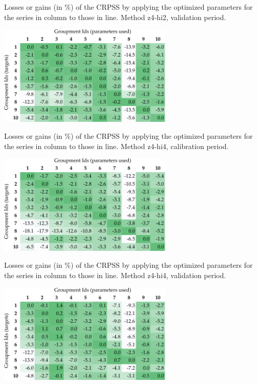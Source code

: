 \documentclass{ametsoc}
\begin{document}
\begin{table}[htb]
	\caption{Losses or gains (in \%) of the CRPSS by applying the optimized parameters for the series in column to those in line. Method z4-hi2, validation period.}
	\centerline{\includegraphics[width=8.3cm]{figures/table_crossing_z4-hi2_valid.pdf}}
	\label{table:crossing_z4-hi2_valid}
\end{table}

\begin{table}[htb]
	\caption{Losses or gains (in \%) of the CRPSS by applying the optimized parameters for the series in column to those in line. Method z4-hi4, calibration period.}
	\centerline{\includegraphics[width=8.3cm]{figures/table_crossing_z4-hi4_calib.pdf}}
	\label{table:crossing_z4-hi4_calib}
\end{table}

\begin{table}[htb]
	\caption{Losses or gains (in \%) of the CRPSS by applying the optimized parameters for the series in column to those in line. Method z4-hi4, validation period.}
	\centerline{\includegraphics[width=8.3cm]{figures/table_crossing_z4-hi4_valid.pdf}}
	\label{table:crossing_z4-hi4_valid}
\end{table}
\end{document}

